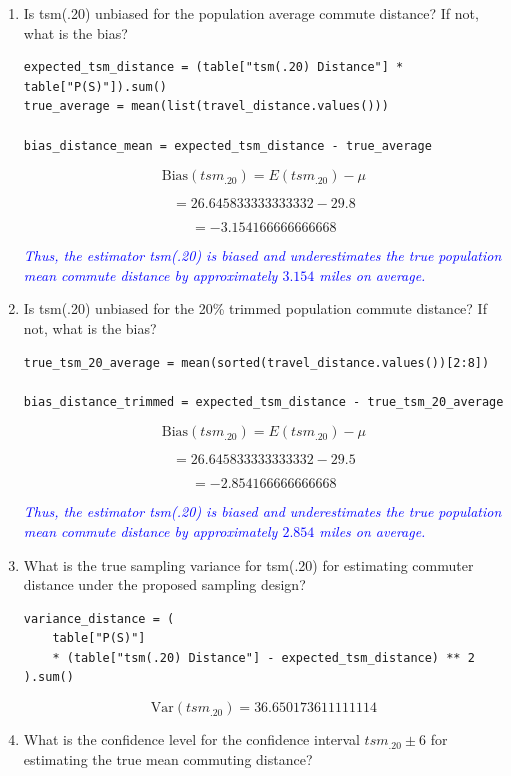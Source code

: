 \documentclass[12pt]{article}
\begin{document}
\begin{enumerate}
\item[(a)] Is tsm(.20) unbiased for the population average commute distance? If not, what is the bias?

\begin{lstlisting}
expected_tsm_distance = (table["tsm(.20) Distance"] * table["P(S)"]).sum()
true_average = mean(list(travel_distance.values()))

bias_distance_mean = expected_tsm_distance - true_average
\end{lstlisting}

\[
\text{Bias}(tsm_{.20}) = E(tsm_{.20}) - \mu
\]

\[
= 26.645833333333332 - 29.8
\]

\[
= -3.154166666666668
\]

\textit{\textcolor{blue}{Thus, the estimator tsm(.20) is biased and underestimates the true population mean commute distance by approximately $3.154$ miles on average.}}
\item[(b)] Is tsm(.20) unbiased for the 20\% trimmed population commute distance? If not, what is the bias?

\begin{lstlisting}
true_tsm_20_average = mean(sorted(travel_distance.values())[2:8])

bias_distance_trimmed = expected_tsm_distance - true_tsm_20_average
\end{lstlisting}

\[
\text{Bias}(tsm_{.20}) = E(tsm_{.20}) - \mu
\]

\[
= 26.645833333333332 - 29.5
\]

\[
= -2.854166666666668
\]

\textit{\textcolor{blue}{Thus, the estimator tsm(.20) is biased and underestimates the true population mean commute distance by approximately $2.854$ miles on average.}}

\item[(c)] What is the true sampling variance for tsm(.20) for estimating commuter distance under the proposed sampling design?

\begin{lstlisting}
variance_distance = (
    table["P(S)"]
    * (table["tsm(.20) Distance"] - expected_tsm_distance) ** 2
).sum()
\end{lstlisting}

\[
\text{Var}(tsm_{.20}) = 36.650173611111114
\]

\item[(d)] What is the confidence level for the confidence interval $tsm_{.20} \pm 6$ for estimating the true mean commuting distance?


\end{enumerate}
\end{document}
